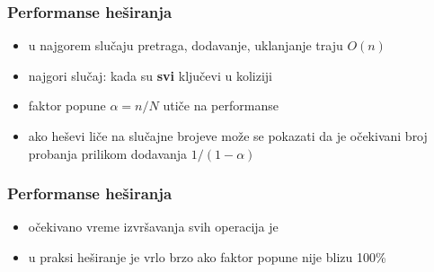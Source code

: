 \documentclass[compress]{beamer}
\begin{document}
\begin{frame}[fragile]
  \frametitle{Performanse heširanja}
  \begin{itemize}
    \item u najgorem slučaju pretraga, dodavanje, uklanjanje traju $O(n)$
    \item najgori slučaj: kada su \textbf{svi} ključevi u koliziji
    \item faktor popune $\alpha = n/N$ utiče na performanse
    \item ako heševi liče na slučajne brojeve može se pokazati da je očekivani broj probanja prilikom dodavanja $1/(1-\alpha)$
  \end{itemize}
\end{frame}

\begin{frame}[fragile]
  \frametitle{Performanse heširanja}
  \begin{itemize}
    \item očekivano vreme izvršavanja svih operacija je 
    \item u praksi heširanje je vrlo brzo ako faktor popune nije blizu 100\%
  \end{itemize}
\end{frame}
\end{document}

